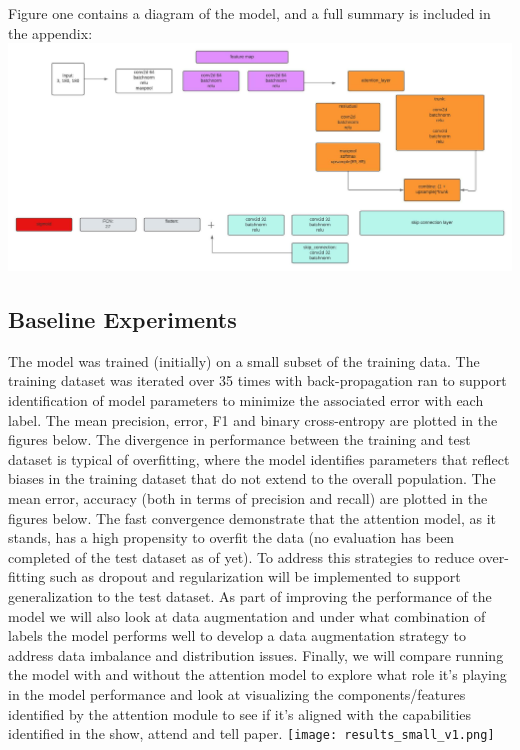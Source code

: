 \documentclass{article}
\begin{document}
\newline
\newline
Figure one contains a diagram of the model, and a full summary is included in the appendix:
\newline
\includegraphics[scale=0.3]{attention_uml_v1.jpeg}
\subsection{Baseline Experiments}
The model was trained (initially) on a small subset of the training data. The training dataset was iterated over 35 times with back-propagation ran to support identification of model parameters to minimize the associated error with each label. 
\newline
\newline
The mean precision, error, F1 and binary cross-entropy are plotted in the figures below. The divergence in performance between the training and test dataset is typical of overfitting, where the model identifies parameters that reflect biases in the training dataset that do not extend to the overall population. 
\newline
\newline
The mean error, accuracy (both in terms of precision and recall) are plotted in the figures below. The fast convergence demonstrate that the attention model, as it stands, has a high propensity to overfit the data (no evaluation has been completed of the test dataset as of yet). To address this strategies to reduce over-fitting such as dropout and regularization will be implemented to support generalization to the test dataset. As part of improving the performance of the model we will also look at data augmentation and under what combination of labels the model performs well to develop a data augmentation strategy to address data imbalance and distribution issues. Finally, we will compare running the model with and without the attention model to explore what role it's playing in the model performance and look at visualizing the components/features identified by the attention module to see if it's aligned with the capabilities identified in the show, attend and tell paper. 
\newline
\texttt{[image: results\_small\_v1.png]}
\end{document}
